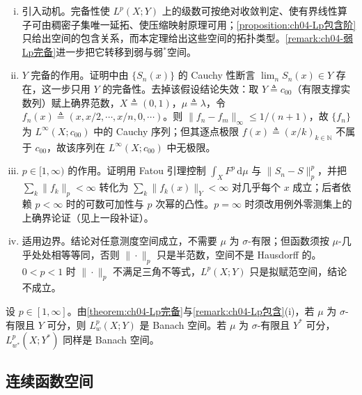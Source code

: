 \documentclass[../../main.tex]{subfiles}%
\begin{document}
\begin{remark}
\begin{enumerate}[(i)]
\item 引入动机。完备性使 $L^p(X;Y)$ 上的级数可按绝对收敛判定、使有界线性算子可由稠密子集唯一延拓、使压缩映射原理可用；\cref{proposition:ch04-Lp包含阶}只给出空间的包含关系，而本定理给出这些空间的拓扑类型。\cref{remark:ch04-弱Lp完备}进一步把它转移到弱与弱$^*$空间。

\item $Y$ 完备的作用。证明中由 $\{S_n(x)\}$ 的 Cauchy 性断言 $\lim_{n}S_n(x)\in Y$ 存在，这一步只用 $Y$ 的完备性。去掉该假设结论失效：取 $Y\triangleq c_{00}$（有限支撑实数列）赋上确界范数，$X\triangleq(0,1)$，$\mu\triangleq\lambda$，令 $f_n(x)\triangleq(x,x/2,\cdots ,x/n,0,\cdots )$。则 $\|f_n-f_m\|_\infty\leqslant1/(n+1)$，故 $\{f_n\}$ 为 $L^\infty(X;c_{00})$ 中的 Cauchy 序列；但其逐点极限 $f(x)\triangleq(x/k)_{k\in\mathbb{N}}$ 不属于 $c_{00}$，故该序列在 $L^\infty(X;c_{00})$ 中无极限。

\item $p\in[1,\infty)$ 的作用。证明用 Fatou 引理控制 $\int_XF^p\,\mathrm{d}\mu$ 与 $\|S_n-S\|_p^p$，并把 $\sum_k\|f_k\|_p<\infty$ 转化为 $\sum_k\|f_k(x)\|_Y<\infty$ 对几乎每个 $x$ 成立；后者依赖 $p<\infty$ 时的可数可加性与 $p$ 次幂的凸性。$p=\infty$ 时须改用例外零测集上的上确界论证（见上一段补证）。

\item 适用边界。结论对任意测度空间成立，不需要 $\mu$ 为 $\sigma$-有限；但函数须按 $\mu$-几乎处处相等等同，否则 $\|\cdot\|_p$ 只是半范数，空间不是 Hausdorff 的。$0<p<1$ 时 $\|\cdot\|_p$ 不满足三角不等式，$L^p(X;Y)$ 只是拟赋范空间，结论不成立。
\end{enumerate}
\end{remark}

\begin{remark}\label{remark:ch04-弱Lp完备}
设 $p\in[1,\infty]$。由\cref{theorem:ch04-Lp完备}与\cref{remark:ch04-Lp包含}(i)，若 $\mu$ 为 $\sigma$-有限且 $Y$ 可分，则 $L^p_w(X;Y)$ 是 Banach 空间。若 $\mu$ 为 $\sigma$-有限且 $Y^*$ 可分，$L^p_{w^*}(X;Y^*)$ 同样是 Banach 空间。
\end{remark}

\subsection{连续函数空间}\label{subsection:ch04-连续函数空间}
\end{document}
